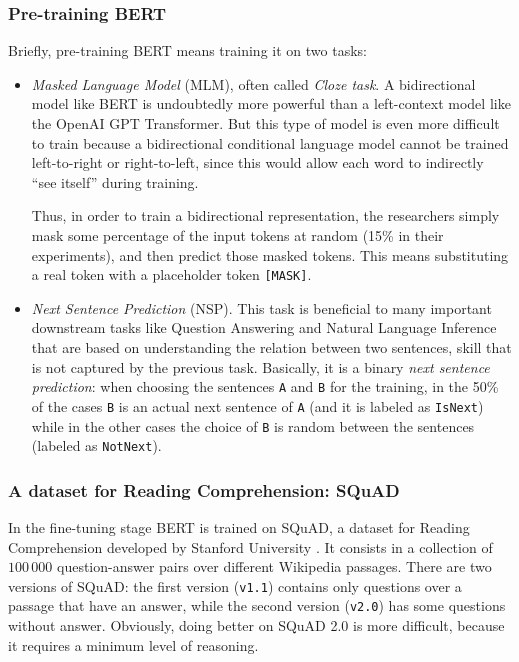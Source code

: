 \subsubsection{Pre-training BERT}
Briefly, pre-training BERT means training it on two tasks:
\begin{itemize}
  \item \textit{Masked Language Model} (MLM), often called \textit{Cloze task}. A bidirectional model like BERT is undoubtedly more powerful than a left-context model like the OpenAI GPT Transformer. But this type of model is even more difficult to train because a bidirectional conditional language model cannot be trained left-to-right or right-to-left, since this would allow each word to indirectly ``see itself'' during training.

  Thus, in order to train a bidirectional representation, the researchers simply mask some percentage of the input tokens at random (15\% in their experiments), and then predict those masked tokens. This means substituting a real token with a placeholder token \texttt{[MASK]}.
  
  \item \textit{Next Sentence Prediction} (NSP). This task is beneficial to many important downstream tasks like Question Answering and Natural Language Inference that are based on understanding the relation between two sentences, skill that is not captured by the previous task. Basically, it is a binary \textit{next sentence prediction}: when choosing the sentences \texttt{A} and \texttt{B} for the training, in the 50\% of the cases \texttt{B} is an actual next sentence of \texttt{A} (and it is labeled as \texttt{IsNext}) while in the other cases the choice of \texttt{B} is random between the sentences (labeled as \texttt{NotNext}).
\end{itemize}

\subsubsection{A dataset for Reading Comprehension: SQuAD}
\label{squad}
In the fine-tuning stage BERT is trained on SQuAD, a dataset for Reading Comprehension developed by Stanford University \cite{squad}. It consists in a collection of $100\,000$ question-answer pairs over different Wikipedia passages. There are two versions of SQuAD: the first version (\texttt{v1.1}) contains only questions over a passage that have an answer, while the second version (\texttt{v2.0}) has some questions without answer. Obviously, doing better on SQuAD 2.0 is more difficult, because it requires a minimum level of reasoning.

